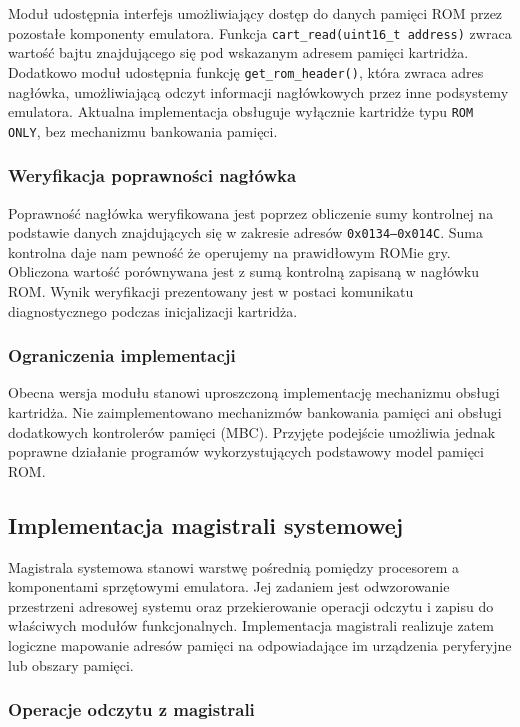 \documentclass{article}
\begin{document}
Moduł udostępnia interfejs umożliwiający dostęp do danych pamięci ROM przez pozostałe komponenty emulatora. Funkcja \texttt{cart\_read(uint16\_t address)} zwraca wartość bajtu znajdującego się pod wskazanym adresem pamięci kartridża. Dodatkowo moduł udostępnia funkcję \texttt{get\_rom\_header()}, która zwraca adres nagłówka, umożliwiającą odczyt informacji nagłówkowych przez inne podsystemy emulatora.
Aktualna implementacja obsługuje wyłącznie kartridże typu \texttt{ROM ONLY}, bez mechanizmu bankowania pamięci.

\subsubsection{Weryfikacja poprawności nagłówka}

Poprawność nagłówka weryfikowana jest poprzez obliczenie sumy kontrolnej na podstawie danych znajdujących się w zakresie adresów \texttt{0x0134--0x014C}. Suma kontrolna daje nam pewność że operujemy na prawidłowym ROMie gry. Obliczona wartość porównywana jest z sumą kontrolną zapisaną w nagłówku ROM. Wynik weryfikacji prezentowany jest w postaci komunikatu diagnostycznego podczas inicjalizacji kartridża.

\subsubsection{Ograniczenia implementacji}

Obecna wersja modułu stanowi uproszczoną implementację mechanizmu obsługi kartridża. Nie zaimplementowano mechanizmów bankowania pamięci ani obsługi dodatkowych kontrolerów pamięci (MBC). Przyjęte podejście umożliwia jednak poprawne działanie programów wykorzystujących podstawowy model pamięci ROM.

\subsection{Implementacja magistrali systemowej}

Magistrala systemowa stanowi warstwę pośrednią pomiędzy procesorem a komponentami sprzętowymi emulatora. Jej zadaniem jest odwzorowanie przestrzeni adresowej systemu oraz przekierowanie operacji odczytu i zapisu do właściwych modułów funkcjonalnych. Implementacja magistrali realizuje zatem logiczne mapowanie adresów pamięci na odpowiadające im urządzenia peryferyjne lub obszary pamięci.

\subsubsection{Operacje odczytu z magistrali}
\end{document}
